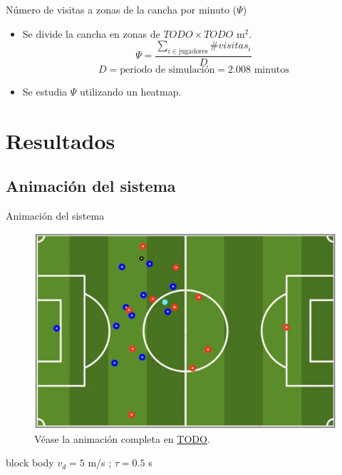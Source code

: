\documentclass{beamer}
\begin{document}
            \begin{frame}{Número de visitas a zonas de la cancha por minuto ($\Psi$)}
                \begin{itemize}
                    \item Se divide la cancha en zonas de $TODO \times TODO \text{ m}^2$.
                    \begin{equation*}
                        \Psi = \frac{\sum_{i \in \text{jugadores}} \#visitas_i}{D}
                    \end{equation*}
                    \begin{equation*}
                        D = \text{periodo de simulación} = 2.008 \text{ minutos}
                    \end{equation*}
                    \item Se estudia $\Psi$ utilizando un \alert{heatmap}.
                \end{itemize}
            \end{frame}

    \section{Resultados}

        \subsection{Animación del sistema}

            \begin{frame}{Animación del sistema}{}
                \vspace*{-0.3cm}
                \begin{figure}[H!]
                    \includegraphics[width=\textwidth]{./animacion_1}
                    \caption*{Véase la animación completa en \url{TODO}.}
                    \label{fig:futbol_1}
                \end{figure}
                \vspace*{-0.5cm}
                \begin{beamercolorbox}[sep=5pt,center]{block body}
                    \centering
                    \small{$v_d = 5$ m/s ; $\tau = 0.5$ s}
                \end{beamercolorbox}
            \end{frame}
\end{document}
